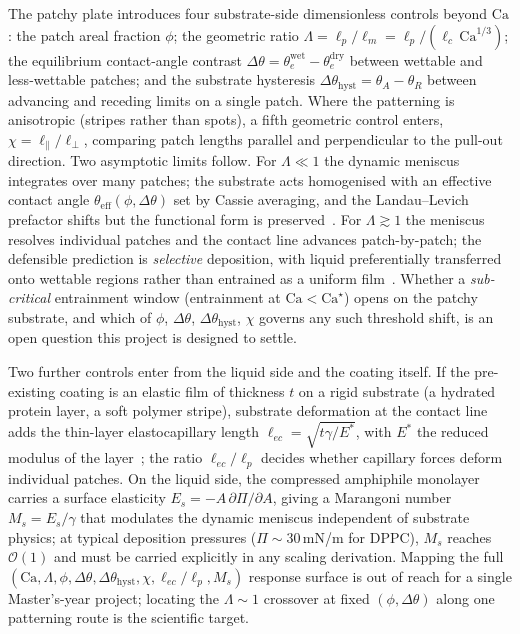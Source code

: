 \documentclass[11pt]{article}
\begin{document}
The patchy plate introduces four substrate-side dimensionless controls beyond $\mathrm{Ca}$: the patch areal fraction $\phi$; the geometric ratio $\Lambda = \ell_p / \ell_m = \ell_p / (\ell_c \, \mathrm{Ca}^{1/3})$; the equilibrium contact-angle contrast $\Delta\theta = \theta_e^{\mathrm{wet}} - \theta_e^{\mathrm{dry}}$ between wettable and less-wettable patches; and the substrate hysteresis $\Delta\theta_{\mathrm{hyst}} = \theta_A - \theta_R$ between advancing and receding limits on a single patch. Where the patterning is anisotropic (stripes rather than spots), a fifth geometric control enters, $\chi = \ell_\parallel / \ell_\perp$, comparing patch lengths parallel and perpendicular to the pull-out direction. Two asymptotic limits follow. For $\Lambda \ll 1$ the dynamic meniscus integrates over many patches; the substrate acts homogenised with an effective contact angle $\theta_{\mathrm{eff}}(\phi, \Delta\theta)$ set by Cassie averaging, and the Landau--Levich prefactor shifts but the functional form is preserved~\citep{bonnWettingSpreading2009}. For $\Lambda \gtrsim 1$ the meniscus resolves individual patches and the contact line advances patch-by-patch; the defensible prediction is \emph{selective} deposition, with liquid preferentially transferred onto wettable regions rather than entrained as a uniform film~\citep{darhuber2000,maleki2007}. Whether a \emph{sub-critical} entrainment window (entrainment at $\mathrm{Ca} < \mathrm{Ca}^\star$) opens on the patchy substrate, and which of $\phi$, $\Delta\theta$, $\Delta\theta_{\mathrm{hyst}}$, $\chi$ governs any such threshold shift, is an open question this project is designed to settle.

Two further controls enter from the liquid side and the coating itself. If the pre-existing coating is an elastic film of thickness $t$ on a rigid substrate (a hydrated protein layer, a soft polymer stripe), substrate deformation at the contact line adds the thin-layer elastocapillary length $\ell_{ec} = \sqrt{t \gamma / E^\ast}$, with $E^\ast$ the reduced modulus of the layer~\citep{bertin2022}; the ratio $\ell_{ec}/\ell_p$ decides whether capillary forces deform individual patches. On the liquid side, the compressed amphiphile monolayer carries a surface elasticity $E_s = -A \, \partial \Pi / \partial A$, giving a Marangoni number $M_s = E_s / \gamma$ that modulates the dynamic meniscus independent of substrate physics; at typical deposition pressures ($\Pi \sim 30$\,mN/m for DPPC), $M_s$ reaches $\mathcal{O}(1)$ and must be carried explicitly in any scaling derivation. Mapping the full $(\mathrm{Ca}, \Lambda, \phi, \Delta\theta, \Delta\theta_{\mathrm{hyst}}, \chi, \ell_{ec}/\ell_p, M_s)$ response surface is out of reach for a single Master's-year project; locating the $\Lambda \sim 1$ crossover at fixed $(\phi, \Delta\theta)$ along one patterning route is the scientific target.
\end{document}
